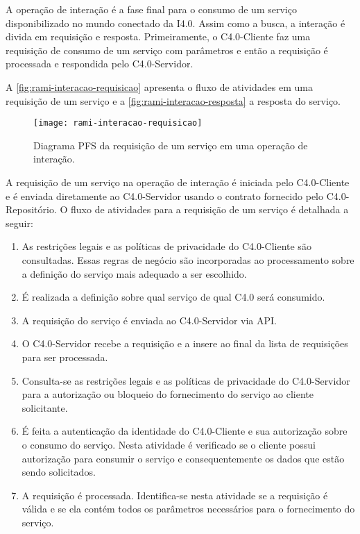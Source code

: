 	A operação de interação é a fase final para o consumo de um serviço disponibilizado no mundo conectado da I4.0. Assim como a busca, a interação é divida em requisição e resposta. Primeiramente, o C4.0-Cliente faz uma requisição de consumo de um serviço com parâmetros e então a requisição é processada e respondida pelo C4.0-Servidor.
	
	 A \autoref{fig:rami-interacao-requisicao} apresenta o fluxo de atividades em uma requisição de um serviço e a \autoref{fig:rami-interacao-resposta} a resposta do serviço.
	
	\begin{figure}[htb]
		\centering
		\label{fig:rami-interacao-requisicao}
		\texttt{[image: rami-interacao-requisicao]}
		\caption{Diagrama PFS da requisição de um serviço em uma operação de interação.}
	\end{figure}

	A requisição de um serviço na operação de interação é iniciada pelo C4.0-Cliente e é enviada diretamente ao C4.0-Servidor usando o contrato fornecido pelo C4.0-Repositório. O fluxo de atividades para a requisição de um serviço é detalhada a seguir:
	
	\begin{enumerate}
		
		\item As restrições legais e as políticas de privacidade do C4.0-Cliente são consultadas. Essas regras de negócio são incorporadas ao processamento sobre a definição do serviço mais adequado a ser escolhido.
		
		\item É realizada a definição sobre qual serviço de qual C4.0 será consumido.
		
		\item A requisição do serviço é enviada ao C4.0-Servidor via API.
		
		\item O C4.0-Servidor recebe a requisição e a insere ao final da lista de requisições para ser processada.
		
		\item Consulta-se as restrições legais e as políticas de privacidade do C4.0-Servidor para a autorização ou bloqueio do fornecimento do serviço ao cliente solicitante.
		
		\item É feita a autenticação da identidade do C4.0-Cliente e sua autorização sobre o consumo do serviço. Nesta atividade é verificado se o cliente possui autorização para consumir o serviço e consequentemente os dados que estão sendo solicitados.
		
		\item A requisição é processada. Identifica-se nesta atividade se a requisição é válida e se ela contém todos os parâmetros necessários para o fornecimento do serviço.

	\end{enumerate}

